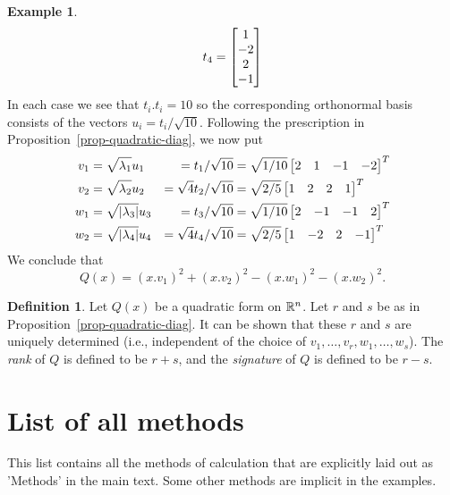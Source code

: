 \documentclass[reqno]{amsart}
\theoremstyle{definition}
\newtheorem{definition}[theorem]{Definition}
\newtheorem{example}[theorem]{Example}
\newcommand{\dfn}[1]{\emph{{#1}}\index{#1}}
\begin{document}
\begin{example}
\[    t_4 = \left[\begin{matrix}  1 \\ -2 \\  2 \\ -1 \end{matrix}\right] 
 \]
 In each case we see that $t_i.t_i=10$ so the corresponding
 orthonormal basis consists of the vectors $u_i=t_i/\sqrt{10}$.
 Following the prescription in Proposition~\ref{prop-quadratic-diag},
 we now put 
 \begin{align*}
  v_1 &= \sqrt{\lambda_1}u_1 &= t_1/\sqrt{10}
       &= \sqrt{1/10}\left[\begin{matrix} 2&1&-1&-2 \end{matrix}\right]^T \\
  v_2 &= \sqrt{\lambda_2}u_2 &= \sqrt{4}t_2/\sqrt{10}
       &= \sqrt{2/5}\left[\begin{matrix} 1&2&2&1 \end{matrix}\right]^T \\
  w_1 &= \sqrt{|\lambda_3|}u_3 &= t_3/\sqrt{10}
       &= \sqrt{1/10}\left[\begin{matrix} 2&-1&-1&2\end{matrix}\right]^T \\
  w_2 &= \sqrt{|\lambda_4|}u_4 &= \sqrt{4}t_4/\sqrt{10}
       &= \sqrt{2/5}\left[\begin{matrix} 1&-2&2&-1\end{matrix}\right]^T
 \end{align*}
 We conclude that 
 \[ Q(x) = (x.v_1)^2 + (x.v_2)^2 - (x.w_1)^2 - (x.w_2)^2. \]
\end{example}

\begin{definition}
 Let $Q(x)$ be a quadratic form on ${\mathbb{R}}^n$.  Let $r$ and $s$
 be as in Proposition~\ref{prop-quadratic-diag}.
 It can be shown that these $r$ and $s$ are uniquely
 determined (i.e., independent of the choice of
 $v_1,\dotsc,v_r,w_1,\dotsc,w_s$).
 The \dfn{rank} of $Q$ is defined
 to be $r+s$, and the \dfn{signature}
 of $Q$ is defined to be $r-s$.
\end{definition}

\appendix

\section{List of all methods}
\label{apx-methods}

This list contains all the methods of calculation that are explicitly
laid out as 'Methods' in the main text.  Some other methods are
implicit in the examples.
\end{document}
